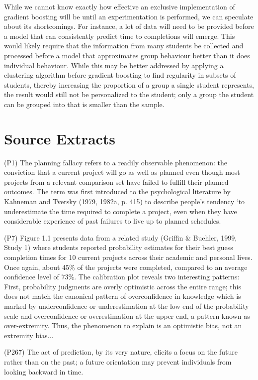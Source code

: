 \documentclass[11pt]{article}
\begin{document}
    While we cannot know exactly how effective an exclusive implementation of gradient boosting will be until an experimentation is performed, we can speculate about its shortcomings. For instance, a lot of data will need to be provided before a model that can consistently predict time to completions will emerge. This would likely require that the information from many students be collected and processed before a model that approximates group behaviour better than it does individual behaviour. While this may be better addressed by applying a clustering algorithm before gradient boosting to find regularity in subsets of students, thereby increasing the proportion of a group a single student represents, the result would still not be personalized to the student; only a group the student can be grouped into that is smaller than the sample. 
\newpage
\section{Source Extracts}
    \cite{buehler2010planning} (P1) The planning fallacy refers to a readily observable phenomenon: the conviction that a current project will go as well as planned even though most projects from a relevant comparison set have failed to fulfill their planned outcomes. The term was first introduced to the psychological literature by Kahneman and Tversky (1979, 1982a, p. 415) to describe people’s tendency ‘to underestimate the time required to complete a project, even when they have considerable experience of past failures to live up to planned schedules. 

    \cite{buehler2010planning} (P7)  Figure 1.1 presents data from a related study (Griffin \& Buehler, 1999, Study 1)  where students reported probability estimates for their best guess completion times for 10 current projects across their academic and personal lives. Once again, about 45\% of the projects were completed, compared to an average confidence level of 73\%. The calibration plot reveals two interesting patterns: First, probability judgments are overly optimistic across the entire range; this does not match the canonical pattern of overconfidence in knowledge which is marked by underconfidence or underestimation at the low end of the probability scale and overconfidence or overestimation at the upper end, a pattern known as over-extremity. Thus, the phenomenon to explain is an optimistic bias, not an extremity bias...

    \cite{buehler1994exploring} (P267) The act of prediction, by its very nature, elicits a focus on the future rather than on the past; a future orientation may prevent individuals from looking backward in time.
\end{document}
